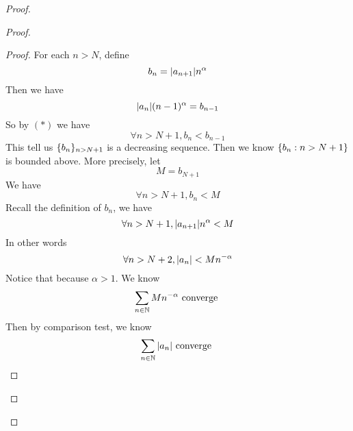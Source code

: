 \documentclass{report}
\begin{document}
\begin{proof}
\begin{proof}
\begin{proof}
For each $n>N$, define
 \begin{equation}
b_n=|a_{n+1}|n^{\alpha }
\end{equation}
Then we have
\begin{equation}
|a_n|(n-1)^{\alpha }=b_{n-1}
\end{equation}
So by $(*)$ we have
\begin{equation}
\forall n>N+1, b_n<b_{n-1}
\end{equation}
This tell us $\{ b_n \}_{n>N+1}$ is a decreasing sequence. Then we know $\{ b_n:n>N+1 \}$ is bounded above. More precisely, let
\begin{equation}
M=b_{N+1}
\end{equation}
We have
\begin{equation}
\forall n>N+1, b_n< M
\end{equation}
Recall the definition of $b_n$, we have
 \begin{equation}
\forall n>N+1, |a_{n+1}|n^{\alpha }<M
\end{equation}
In other words
\begin{equation}
\forall n>N+2, |a_n|<Mn^{-\alpha }
\end{equation}
Notice that because $\alpha>1 $. We know 
\begin{equation}
\sum_{n\in\mathbb{N}} Mn^{-\alpha }\text{ converge }
\end{equation}
Then by comparison test, we know
\begin{equation}
\sum_{n\in\mathbb{N}} |a_n|\text{ converge }
\end{equation}

\end{proof}


\end{proof}
\end{proof}
\end{document}
